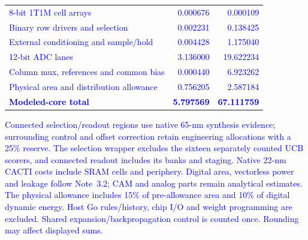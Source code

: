 \begin{table}[t]
\begin{tabular*}{\textwidth}{@{\extracolsep{\fill}}lrr@{}}
\textcolor{blue}{8-bit 1T1M cell arrays} & \textcolor{blue}{0.000676} & \textcolor{blue}{0.000109} \\
\textcolor{blue}{Binary row drivers and selection} & \textcolor{blue}{0.002231} & \textcolor{blue}{0.138425} \\
\textcolor{blue}{External conditioning and sample/hold} & \textcolor{blue}{0.004428} & \textcolor{blue}{1.175040} \\
\textcolor{blue}{12-bit ADC lanes} & \textcolor{blue}{3.136000} & \textcolor{blue}{19.622234} \\
\textcolor{blue}{Column mux, references and common bias} & \textcolor{blue}{0.000440} & \textcolor{blue}{6.923262} \\
\textcolor{blue}{Physical area and distribution allowance} & \textcolor{blue}{0.756205} & \textcolor{blue}{2.587184} \\
\midrule
\textcolor{blue}{\textbf{Modeled-core total}} & \textcolor{blue}{\textbf{5.797569}} & \textcolor{blue}{\textbf{67.111759}} \\
\bottomrule
\end{tabular*}
\par\vspace{0.3em}
{\scriptsize \textcolor{blue}{Connected selection/readout regions use native 65-nm synthesis evidence; surrounding control and offset correction retain engineering allocations with a 25\% reserve. The selection wrapper excludes the sixteen separately counted UCB scorers, and connected readout includes its banks and staging. Native 22-nm CACTI costs include SRAM cells and periphery. Digital area, vectorless power and leakage follow Note~3.2; CAM and analog parts remain analytical estimates. The physical allowance includes 15\% of pre-allowance area and 10\% of digital dynamic energy. Host Go rules/history, chip I/O and weight programming are excluded. Shared expansion/backpropagation control is counted once. Rounding may affect displayed sums.}}
\end{table}
